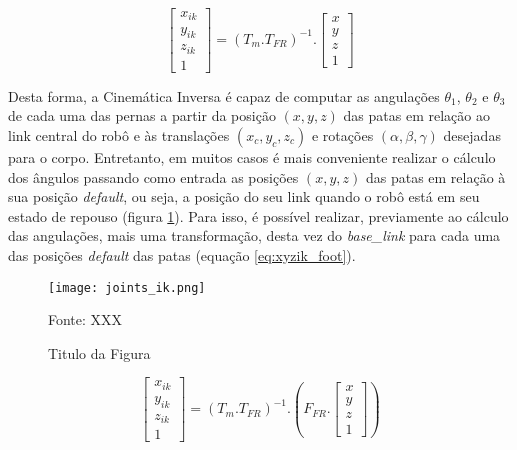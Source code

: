 \documentclass[../main.tex]{subfiles}
\begin{document}
\begin{equation}
  \label{eq:xyzik}
  \begin{bmatrix}
    x_{ik} \\
    y_{ik} \\
    z_{ik} \\
    1
  \end{bmatrix}= (T_m.T_{FR})^{-1}.
  \begin{bmatrix}
    x \\
    y \\
    z \\
    1
  \end{bmatrix}
\end{equation}

Desta forma, a Cinemática Inversa é capaz de computar as angulações  $\theta_1$, $\theta_2$ e $\theta_3$ de cada uma das pernas a partir da posição $(x, y, z)$ das patas em relação ao link central do robô e às translações $(x_c, y_c, z_c)$ e rotações $(\alpha, \beta, \gamma)$ desejadas para o corpo. Entretanto, em muitos casos é mais conveniente realizar o cálculo dos ângulos passando como entrada as posições $(x, y, z)$ das patas em relação à sua posição \textit{default}, ou seja, a posição do seu link quando o robô está em seu estado de repouso (figura \ref{fig:joints_ik}). Para isso, é possível realizar, previamente ao cálculo das angulações, mais uma transformação, desta vez do \textit{base\_link} para cada uma das posições \textit{default} das patas (equação \ref{eq:xyzik_foot}).

\begin{figure}[h]
  \centering
  \caption{Titulo da Figura}
  \texttt{[image: joints\_ik.png]}

  Fonte: XXX
  \label{fig:joints_ik}
\end{figure}


\begin{equation}
  \label{eq:xyzik_foot}
  \begin{bmatrix}
    x_{ik} \\
    y_{ik} \\
    z_{ik} \\
    1
  \end{bmatrix}= (T_m.T_{FR})^{-1}.
  (F_{FR}.
  \begin{bmatrix}
    x \\
    y \\
    z \\
    1
  \end{bmatrix})
\end{equation}
\end{document}
